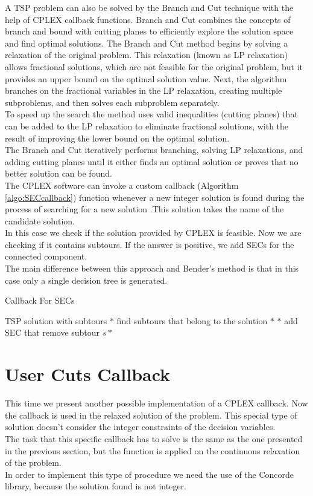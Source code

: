 A TSP problem can also be solved by the Branch and Cut technique with the help of CPLEX callback functions. Branch and Cut combines the concepts of branch and bound with cutting planes to efficiently explore the solution space and find optimal solutions. The Branch and Cut method begins by solving a relaxation of the original problem. This relaxation (known as LP relaxation) allows fractional solutions, which are not feasible for the original problem, but it provides an upper bound on the optimal solution value.
Next, the algorithm branches on the fractional variables in the LP relaxation, creating multiple subproblems, and then solves each subproblem separately.\\
To speed up the search the method uses valid inequalities (cutting planes) that can be added to the LP relaxation to eliminate fractional solutions, with the result of improving the lower bound on the optimal solution. \\
The Branch and Cut iteratively performs branching, solving LP relaxations, and adding cutting planes until it either finds an optimal solution or proves that no better solution can be found. \\
The CPLEX software can invoke a custom callback (Algorithm \ref{algo:SECcallback}) function whenever a new integer solution is found during the process of searching for a new solution .This solution takes the name of the candidate solution.\\
In this case we check if the solution provided by CPLEX is feasible. Now we are checking if it contains subtours. If the answer is positive, we add SECs for the connected component. \\
The main difference between this approach and Bender’s method is that in this case only a single decision tree is generated.

\begin{algorithm}
    \caption{Callback For SECs}\label{algo:SECcallback}
    \begin{algorithmic}[1]
    \Require TSP solution with subtours
    \State $*$ find subtours that belong to the solution $*$
    \State $*$ add SEC that remove subtour $s *$
    \EndFor
    
    \end{algorithmic}
\end{algorithm}


\section{User Cuts Callback}
This time we present another possible implementation of a CPLEX callback. Now the callback is used in the relaxed solution of the problem. This special type of solution doesn’t consider the integer constraints of the decision variables. \\
The task that this specific callback has to solve is the same as the one presented in the previous section, but the function  is applied on the continuous relaxation of the problem.\\
In order to implement this type of procedure we need the use of the Concorde library, because the solution found is not integer.

